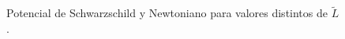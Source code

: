 \documentclass[11pt,twoside,openright,spanish]{report}
\numberwithin{equation}{chapter}
\numberwithin{figure}{chapter}
\numberwithin{table}{chapter}
\begin{document}
\begin{figure}[H]
	\begin{minipage}{.5\linewidth}
		\centering
	\end{minipage}%
	\begin{minipage}{.5\linewidth}
		\centering
	\end{minipage}
	\caption{Potencial de Schwarzschild y Newtoniano para valores distintos de $\tilde{L}$.}
\end{figure}
\end{document}
